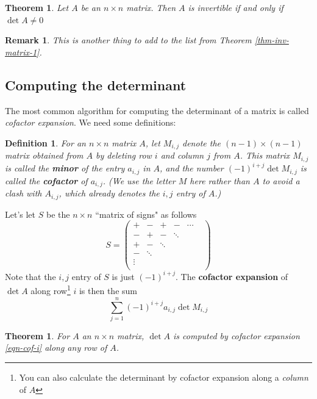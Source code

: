 \documentclass[12pt]{article}
\numberwithin{equation}{subsection}
\numberwithin{figure}{subsection}
\newtheorem{thm}[subsection]{Theorem}
\newtheorem{defn}[subsection]{Definition}
\theoremstyle{note}
\newtheorem{remark}[subsection]{Remark}
\begin{document}
\begin{thm}
	Let $A$ be an $n\times n$ matrix. Then $A$ is invertible if and only if $\det A\neq 0$ 
\end{thm}
\begin{remark}This is another thing to add to the list from Theorem \ref{thm-inv-matrix-1}.\end{remark}

\subsection{Computing the determinant}
The most common algorithm for computing the determinant of a matrix is called \textit{cofactor expansion}. We need some definitions: 

\begin{defn}For an $n\times n$ matrix $A$, let $M_{i,j}$ denote the $(n-1)\times (n-1)$ matrix obtained from $A$ by deleting row $i$ and column $j$ from $A$. This matrix $M_{i,j}$ is called the \textbf{minor} of the entry $a_{i,j}$ in $A$, and the number $(-1)^{i+j}\det M_{i,j}$ is called the \textbf{cofactor} of $a_{i,j}$. (We use the letter $M$ here rather than $A$ to avoid a clash with $A_{i,j}$, which already denotes the $i,j$ \textit{entry} of $A$.)
\end{defn} 

Let's let $S$ be the $n\times n$ ``matrix of signs" as follows
\begin{equation} S=\begin{pmatrix} 
+ & - & + & - & \cdots & \\ 
- & + & - & \ddots && \\
+ & - & \ddots &&& \\
- & \ddots &&&& \\
\vdots &&&&\\
&&&&&
\end{pmatrix}\end{equation}
Note that the $i,j$ entry of $S$ is just $(-1)^{i+j}$. The \textbf{cofactor expansion} of $\det A$ along row\footnote{You can also calculate the determinant by cofactor expansion along a \textit{column} of $A$} $i$ is then the sum
\begin{equation} \label{eqn-cof-i}
	 \sum_{j=1}^n (-1)^{i+j} a_{i,j} \det M_{i,j} 
\end{equation}

\begin{thm}
	For $A$ an $n\times n$ matrix, $\det A$ is computed by cofactor expansion \eqref{eqn-cof-i} along any row of $A$. 

\end{thm}
\end{document}
